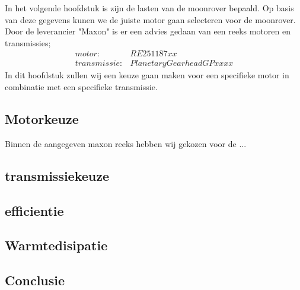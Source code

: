 In het volgende hoofdstuk is zijn de lasten van de moonrover bepaald. Op basis van deze gegevens kunen we de juiste motor gaan selecteren voor de moonrover. Door de leverancier "Maxon" is er een advies gedaan van een reeks motoren en transmissies;
\begin{align*}
        motor: &RE25 1187xx\\
        transmissie: &Planetary Gearhead GP xx xx
\end{align*}
In dit hoofdstuk zullen wij een keuze gaan maken voor een specifieke motor in combinatie met een specifieke transmissie.


\subsection{Motorkeuze}
Binnen de aangegeven maxon reeks hebben wij gekozen voor de ...

\subsection{transmissiekeuze}

\subsection{efficientie}

\subsection{Warmtedisipatie}

\subsection{Conclusie}